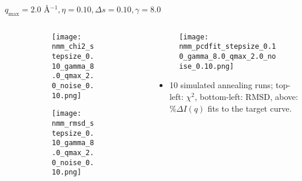 \documentclass{beamer}
\begin{document}
\begin{frame}{$ q_{\textrm{max}}=2.0 $ \AA $^{-1}, \eta=0.10, \Delta s=0.10, \gamma=8.0$}
	\begin{columns}
		\begin{column}{.5\textwidth}
			\begin{figure}[H]
			\centering
			\begin{subfigure}[b]{\textwidth}
				\centering
				\texttt{[image: nmm\_chi2\_stepsize\_0.10\_gamma\_8.0\_qmax\_2.0\_noise\_0.10.png]}
				\label{fig:}
			\end{subfigure}
			\begin{subfigure}[b]{\textwidth}
				\centering
				\texttt{[image: nmm\_rmsd\_stepsize\_0.10\_gamma\_8.0\_qmax\_2.0\_noise\_0.10.png]}
				\label{fig:}
			\end{subfigure}
			\end{figure}
		\end{column}
		\begin{column}{.5\textwidth}
			\begin{figure}[H]
				\centering
				\texttt{[image: nmm\_pcdfit\_stepsize\_0.10\_gamma\_8.0\_qmax\_2.0\_noise\_0.10.png]}
				\label{fig:}
			\end{figure}
			\begin{itemize}
				\item 10 simulated annealing runs; top-left: $\chi^2$, bottom-left: RMSD, above: $\%\Delta I(q)$ fits to the target curve.
			\end{itemize}
		\end{column}
	\end{columns}
\end{frame}
 
\end{document}

